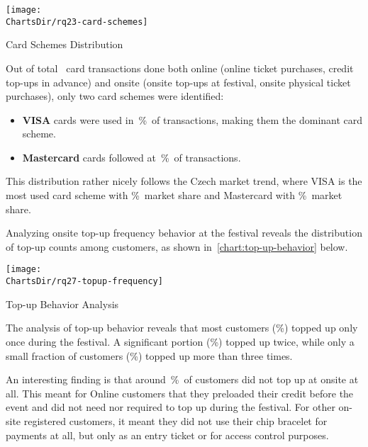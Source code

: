 
\begin{chart}[h]
	\centering
	\texttt{[image: \\ChartsDir/rq23-card-schemes]}
	\caption{ Card Schemes Distribution}
	\label{chart:card-schemes}
	\source
\end{chart}

Out of total ~card transactions done both online (online ticket purchases, credit top-ups in advance) and onsite (onsite top-ups at festival, onsite physical ticket purchases), only two card schemes were identified:
\begin{itemize}
	\item \textbf{VISA} cards were used in~\%~of transactions, making them the dominant card scheme.
	\item \textbf{Mastercard} cards followed at~\%~of transactions.
\end{itemize}

This distribution rather nicely follows the Czech market trend, where VISA is the most used card scheme with \%~market share and Mastercard with \%~market share\cite{spbk_czech_profil_karty}.

\pagebreak[4]


Analyzing onsite top-up frequency behavior at the festival reveals the distribution of top-up counts among customers, as shown in~\autoref{chart:top-up-behavior} below.

\begin{chart}[h]
	\centering
	\texttt{[image: \\ChartsDir/rq27-topup-frequency]}
	\caption{ Top-up Behavior Analysis}
	\label{chart:top-up-behavior}
	\source
\end{chart}

The analysis of top-up behavior reveals that most customers (\%) topped up only once during the festival.
A significant portion (\%) topped up twice, while only a small fraction of customers (\%) topped up more than three times.

An interesting finding is that around~\%~of customers did not top up at onsite at all.
This meant for Online customers that they preloaded their credit before the event and did not need nor required to top up during the festival.
For other on-site registered customers, it meant they did not use their chip bracelet for payments at all, but only as an entry ticket or for access control purposes.

